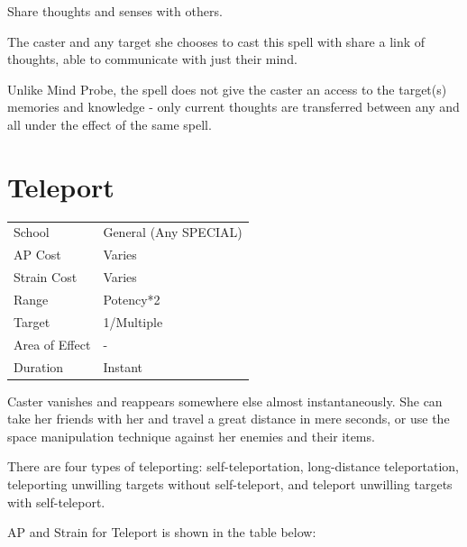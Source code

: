 \documentclass[11pt,a4paper,twocolumn]{book}
\begin{document}
\medskip

Share thoughts and senses with others.

The caster and any target she chooses to cast this spell with share a link of thoughts, able to communicate with just their mind.

Unlike Mind Probe, the spell does not give the caster an access to the target(s) memories and knowledge - only current thoughts are transferred between any and all under the effect of the same spell.

\vfill


\section*{Teleport}
{
	\begin{tabu} to 75mm{| X[l,4] | X[l,7] |}
		\hline
		School 			& General (Any SPECIAL) 		\\
        AP Cost	      	& Varies 						\\
        Strain Cost     & Varies 						\\
        Range     		& Potency*2 					\\
        Target      	& 1/Multiple					\\
        Area of Effect  & - 	 						\\
        Duration     	& Instant						\\ \hline
	\end{tabu}
		
}

\medskip

Caster vanishes and reappears somewhere else almost instantaneously. She can take her friends with her and travel a great distance in mere seconds, or use the space manipulation technique against her enemies and their items.
 
There are four types of teleporting: self-teleportation, long-distance teleportation, teleporting unwilling targets without self-teleport, and teleport unwilling targets with self-teleport.

AP and Strain for Teleport is shown in the table below:
\end{document}
